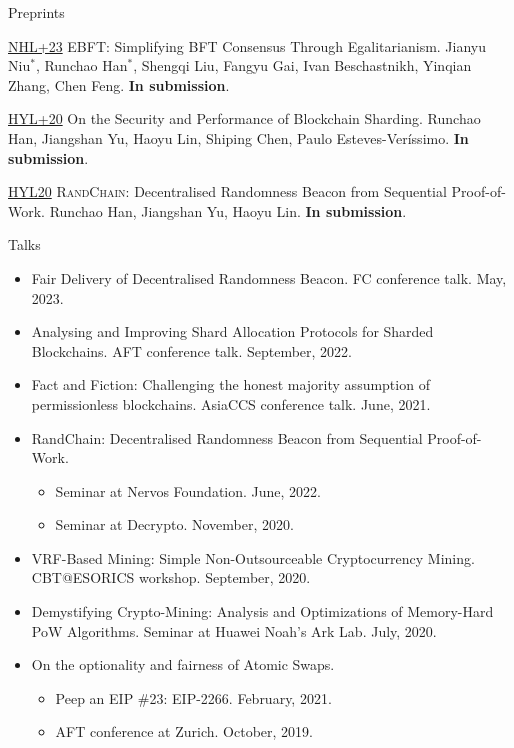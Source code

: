 \documentclass{resume} %
\begin{document}
\begin{rSection}{Preprints}
    \item[\href{https://arxiv.org/abs/2012.01636}{NHL+23}] EBFT: Simplifying BFT Consensus Through Egalitarianism. Jianyu Niu$^*$, Runchao Han$^*$, Shengqi Liu, Fangyu Gai, Ivan Beschastnikh, Yinqian Zhang, Chen Feng. \textbf{In submission}.
    \item[\href{https://eprint.iacr.org/2020/1033}{HYL+20}] On the Security and Performance of Blockchain Sharding. Runchao Han, Jiangshan Yu, Haoyu Lin, Shiping Chen, Paulo Esteves-Veríssimo. \textbf{In submission}.
    \item[\href{https://eprint.iacr.org/2020/1033}{HYL20}] \textsc{RandChain}: Decentralised Randomness Beacon from Sequential Proof-of-Work. Runchao Han, Jiangshan Yu, Haoyu Lin. \textbf{In submission}.
\end{rSection}

\begin{rSection}{Talks}
    \begin{itemize}
        \item Fair Delivery of Decentralised Randomness Beacon. FC conference talk. May, 2023.
        \item Analysing and Improving Shard Allocation Protocols for Sharded Blockchains. AFT conference talk. September, 2022.
        \item Fact and Fiction: Challenging the honest majority assumption of permissionless blockchains. AsiaCCS conference talk. June, 2021.
        \item RandChain: Decentralised Randomness Beacon from Sequential Proof-of-Work.
              \begin{itemize}
                  \item Seminar at Nervos Foundation. June, 2022.
                  \item Seminar at Decrypto. November, 2020.
              \end{itemize}
        \item VRF-Based Mining: Simple Non-Outsourceable Cryptocurrency Mining. CBT@ESORICS workshop. September, 2020.
        \item Demystifying Crypto-Mining: Analysis and Optimizations of Memory-Hard PoW Algorithms. Seminar at Huawei Noah's Ark Lab. July, 2020.
        \item On the optionality and fairness of Atomic Swaps.
              \begin{itemize}
                  \item Peep an EIP \#23: EIP-2266. February, 2021.
                  \item AFT conference at Zurich. October, 2019.
              \end{itemize}
    \end{itemize}
\end{rSection}
\end{document}

